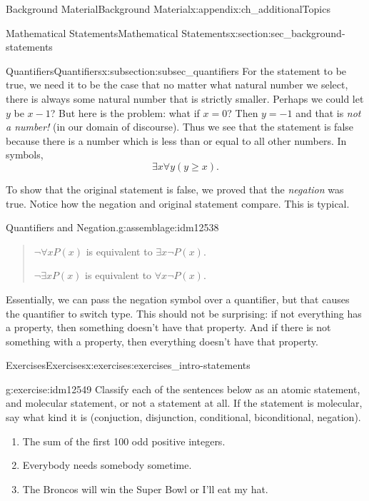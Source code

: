 \documentclass[oneside,10pt,]{book}
\numberwithin{equation}{chapter}
\begin{document}
\begin{appendixptx}{Background Material}{}{Background Material}{}{}{x:appendix:ch_additionalTopics}
\begin{sectionptx}{Mathematical Statements}{}{Mathematical Statements}{}{}{x:section:sec_background-statements}
\begin{subsectionptx}{Quantifiers}{}{Quantifiers}{}{}{x:subsection:subsec_quantifiers}
For the statement to be true, we need it to be the case that no matter what natural number we select, there is always some natural number that is strictly smaller. Perhaps we could let \(y\) be \(x-1\)? But here is the problem: what if \(x = 0\)? Then \(y = -1\) and that is \emph{not a number!} (in our domain of discourse). Thus we see that the statement is false because there is a number which is less than or equal to all other numbers. In symbols,%
\begin{equation*}
\exists x \forall y (y \ge x).
\end{equation*}
%
\par
To show that the original statement is false, we proved that the \emph{negation} was true. Notice how the negation and original statement compare. This is typical.%
\begin{assemblage}{Quantifiers and Negation.}{g:assemblage:idm12538}%
\begin{quote}%
\(\neg \forall x P(x)\) is equivalent to \(\exists x \neg P(x)\).%
\par
\(\neg \exists x P(x)\) is equivalent to \(\forall x \neg P(x)\).%
\end{quote}
\end{assemblage}
Essentially, we can pass the negation symbol over a quantifier, but that causes the quantifier to switch type. This should not be surprising: if not everything has a property, then something doesn't have that property. And if there is not something with a property, then everything doesn't have that property.%
\end{subsectionptx}
%
%
\typeout{************************************************}
\typeout{************************************************}
%
\begin{exercises-subsection}{Exercises}{}{Exercises}{}{}{x:exercises:exercises_intro-statements}
\begin{divisionexercise}{1}{}{}{g:exercise:idm12549}%
Classify each of the sentences below as an atomic statement, and molecular statement, or not a statement at all.  If the statement is molecular, say what kind it is (conjuction, disjunction, conditional, biconditional, negation).%
\begin{enumerate}[label=(\alph*)]
\item{}The sum of the first 100 odd positive integers.%
\item{}Everybody needs somebody sometime.%
\item{}The Broncos will win the Super Bowl or I'll eat my hat.%

\end{enumerate}
\end{divisionexercise}
\end{exercises-subsection}
\end{sectionptx}
\end{appendixptx}
\end{document}
